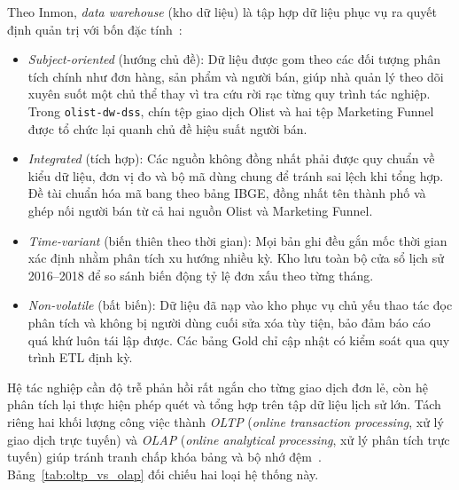 \documentclass[a4paper]{article}
\begin{document}
Theo Inmon, \textit{data warehouse} (kho dữ liệu) là tập hợp dữ liệu phục vụ ra quyết định quản trị với bốn đặc tính~\cite{bib:inmon2005}:
\begin{itemize}
  \item \textit{Subject-oriented} (hướng chủ đề): Dữ liệu được gom theo các đối tượng phân tích chính như đơn hàng, sản phẩm và người bán, giúp nhà quản lý theo dõi xuyên suốt một chủ thể thay vì tra cứu rời rạc từng quy trình tác nghiệp. Trong \texttt{olist-dw-dss}, chín tệp giao dịch Olist và hai tệp Marketing Funnel được tổ chức lại quanh chủ đề hiệu suất người bán.
  \item \textit{Integrated} (tích hợp): Các nguồn không đồng nhất phải được quy chuẩn về kiểu dữ liệu, đơn vị đo và bộ mã dùng chung để tránh sai lệch khi tổng hợp. Đề tài chuẩn hóa mã bang theo bảng IBGE, đồng nhất tên thành phố và ghép nối người bán từ cả hai nguồn Olist và Marketing Funnel.
  \item \textit{Time-variant} (biến thiên theo thời gian): Mọi bản ghi đều gắn mốc thời gian xác định nhằm phân tích xu hướng nhiều kỳ. Kho lưu toàn bộ cửa sổ lịch sử 2016--2018 để so sánh biến động tỷ lệ đơn xấu theo từng tháng.
  \item \textit{Non-volatile} (bất biến): Dữ liệu đã nạp vào kho phục vụ chủ yếu thao tác đọc phân tích và không bị người dùng cuối sửa xóa tùy tiện, bảo đảm báo cáo quá khứ luôn tái lập được. Các bảng Gold chỉ cập nhật có kiểm soát qua quy trình ETL định kỳ.
\end{itemize}

Hệ tác nghiệp cần độ trễ phản hồi rất ngắn cho từng giao dịch đơn lẻ, còn hệ phân tích lại thực hiện phép quét và tổng hợp trên tập dữ liệu lịch sử lớn. Tách riêng hai khối lượng công việc thành \textit{OLTP} (\textit{online transaction processing}, xử lý giao dịch trực tuyến) và \textit{OLAP} (\textit{online analytical processing}, xử lý phân tích trực tuyến) giúp tránh tranh chấp khóa bảng và bộ nhớ đệm~\cite{bib:inmon2005,bib:kimball2013}. Bảng~\ref{tab:oltp_vs_olap} đối chiếu hai loại hệ thống này.
\end{document}
